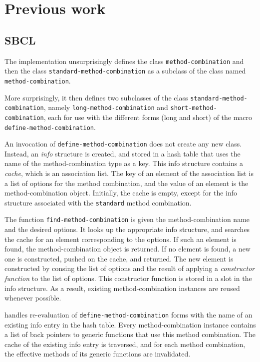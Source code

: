 \section{Previous work}

\subsection{SBCL}

The \sbcl{} \commonlisp{} implementation unsurprisingly defines the
class \texttt{method\--combination} and then the class
\texttt{standard\--method\--combination} as a subclass of
the class named \texttt{method\--combination}.

More surprisingly, it then defines two subclasses of the class
\texttt{standard\--method\--combination}, namely
\texttt{long\--method\--combination} and
\texttt{short\--method\--combination}, each for use with the different
forms (long and short) of the macro
\texttt{define\--method\--combination}.

An invocation of \texttt{define-method-combination} does not create
any new class.  Instead, an \emph{info} structure is created, and
stored in a hash table that uses the name of the method-combination
type as a key.  This info structure contains a \emph{cache}, which is
an association list.  The key of an element of the association list is
a list of options for the method combination, and the value of an
element is the method-combination object.  Initially, the cache is
empty, except for the info structure associated with the
\texttt{standard} method combination.

The function \texttt{find-method-combination} is given the
method-combination name and the desired options.  It looks up the
appropriate info structure, and searches the cache for an element
corresponding to the options.  If such an element is found, the
method-combination object is returned.  If no element is found, a new
one is constructed, pushed on the cache, and returned.  The new
element is constructed by consing the list of options and the result
of applying a \emph{constructor function} to the list of options.
This constructor function is stored in a slot in the info structure.
As a result, existing method-combination instances are reused whenever
possible.

\sbcl{} handles re-evaluation of \texttt{define-method-combination}
forms with the name of an existing info entry in the hash table.
Every method-combination instance contains a list of back pointers to
generic functions that use this method combination.  The cache of the
existing info entry is traversed, and for each method combination, the
effective methods of its generic functions are invalidated.

